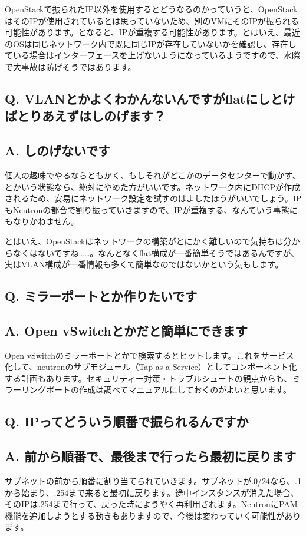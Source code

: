 \documentclass[9pt,b5paper,tombo,openany]{jsbook}
\begin{document}
OpenStackで振られたIP以外を使用するとどうなるのかっていうと、OpenStackはそのIPが使用されているとは思っていないため、別のVMにそのIPが振られる可能性があります。となると、IPが重複する可能性があります。とはいえ、最近のOSは同じネットワーク内で既に同じIPが存在していないかを確認し、存在している場合はインターフェースを上げないようになっているようですので、水際で大事故は防げそうではあります。

\subsection*{{\LARGE\bfseries Q.} VLANとかよくわかんないんですがflatにしとけばとりあえずはしのげます？}
\subsection*{{\LARGE\bfseries A.} しのげないです}
個人の趣味でやるならともかく、もしそれがどこかのデータセンターで動かす、とかいう状態なら、絶対にやめた方がいいです。ネットワーク内にDHCPが作成されるため、安易にネットワーク設定を試すのはよしたほうがいいでしょう。IPもNeutronの都合で割り振っていきますので、IPが重複する、なんていう事態にもなりかねません。

とはいえ、OpenStackはネットワークの構築がとにかく難しいので気持ちは分からなくはないですね……。なんとなくflat構成が一番簡単そうではあるんですが、実はVLAN構成が一番情報も多くて簡単なのではないかという気もします。

\subsection*{{\LARGE\bfseries Q.} ミラーポートとか作りたいです}
\subsection*{{\LARGE\bfseries A.} Open vSwitchとかだと簡単にできます}
Open vSwitchのミラーポートとかで検索するとヒットします。これをサービス化して、neutronのサブモジュール（Tap as a Service）としてコンポーネント化する計画もあります。セキュリティー対策・トラブルシュートの観点からも、ミラーリングポートの作成は調べてマニュアルにしておくのがよいと思います。

\subsection*{{\LARGE\bfseries Q.} IPってどういう順番で振られるんですか}
\subsection*{{\LARGE\bfseries A.} 前から順番で、最後まで行ったら最初に戻ります}
サブネットの前から順番に割り当てられていきます。サブネットが.0/24なら、.1から始まり、.254まで来ると最初に戻ります。途中インスタンスが消えた場合、そのIPは.254まで行って、戻った時にようやく再利用されます。NeutronにPAM機能を追加しようとする動きもありますので、今後は変わっていく可能性があります。
\end{document}
